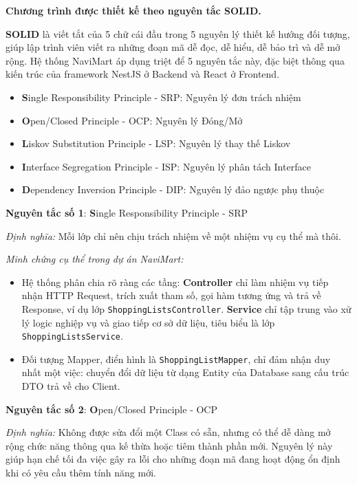 \documentclass[../main.tex]{subfiles}
\begin{document}
\textbf{Chương trình được thiết kế theo nguyên tắc SOLID.}

\textbf{SOLID} là viết tắt của 5 chữ cái đầu trong 5 nguyên lý thiết kế hướng đối tượng, giúp lập trình viên viết ra những đoạn mã dễ đọc, dễ hiểu, dễ bảo trì và dễ mở rộng. Hệ thống NaviMart áp dụng triệt để 5 nguyên tắc này, đặc biệt thông qua kiến trúc của framework NestJS ở Backend và React ở Frontend.

\begin{itemize}
    \item \textbf{S}ingle Responsibility Principle - SRP: Nguyên lý đơn trách nhiệm
    \item \textbf{O}pen/Closed Principle - OCP: Nguyên lý Đóng/Mở
    \item \textbf{L}iskov Substitution Principle - LSP: Nguyên lý thay thế Liskov
    \item \textbf{I}nterface Segregation Principle - ISP: Nguyên lý phân tách Interface
    \item \textbf{D}ependency Inversion Principle - DIP: Nguyên lý đảo ngược phụ thuộc
\end{itemize}

\textbf{Nguyên tắc số 1}: \textbf{S}ingle Responsibility Principle - SRP

\textit{Định nghĩa:} Mỗi lớp chỉ nên chịu trách nhiệm về một nhiệm vụ cụ thể mà thôi.

\textit{Minh chứng cụ thể trong dự án NaviMart:} 
\begin{itemize}
    \item Hệ thống phân chia rõ ràng các tầng: \textbf{Controller} chỉ làm nhiệm vụ tiếp nhận HTTP Request, trích xuất tham số, gọi hàm tương ứng và trả về Response, ví dụ lớp \texttt{ShoppingListsController}. \textbf{Service} chỉ tập trung vào xử lý logic nghiệp vụ và giao tiếp cơ sở dữ liệu, tiêu biểu là lớp \texttt{ShoppingListsService}.
    \item Đối tượng Mapper, điển hình là \texttt{ShoppingListMapper}, chỉ đảm nhận duy nhất một việc: chuyển đổi dữ liệu từ dạng Entity của Database sang cấu trúc DTO trả về cho Client.
\end{itemize}

\textbf{Nguyên tắc số 2}: \textbf{O}pen/Closed Principle - OCP

\textit{Định nghĩa:} Không được sửa đổi một Class có sẵn, nhưng có thể dễ dàng mở rộng chức năng thông qua kế thừa hoặc tiêm thành phần mới. Nguyên lý này giúp hạn chế tối đa việc gây ra lỗi cho những đoạn mã đang hoạt động ổn định khi có yêu cầu thêm tính năng mới.
\end{document}
